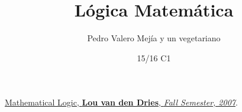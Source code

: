 \documentclass[nochap]{apuntes}
\title{Lógica Matemática}
\author{Pedro Valero Mejía y un vegetariano}
\date{15/16 C1}
\begin{document}
\pagestyle{plain}
\maketitle

\tableofcontents
\newpage

\newpage

\newpage

\newpage



\appendix









\newpage
\begin{thebibliography}{}

	\href{http://www.math.uiuc.edu/~henson/Math570/Fall2009/Math570notes.pdf}{Mathematical Logic,
	\textbf{Lou van den Dries},
	\emph{Fall Semester,
	2007}}.

\end{thebibliography}

\printindex
\end{document}
